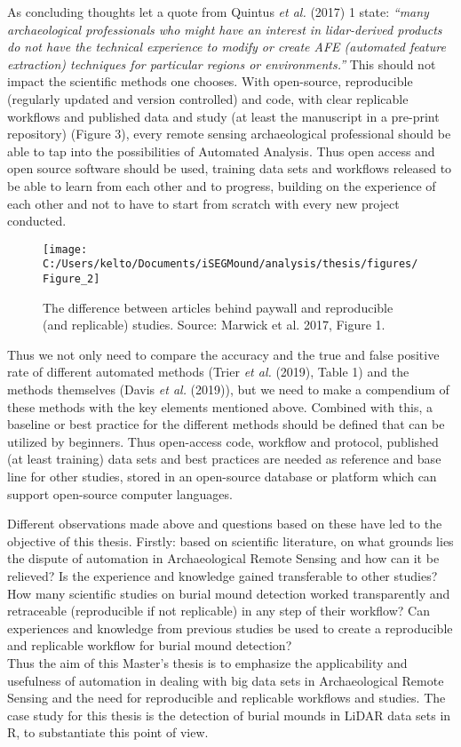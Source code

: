 \documentclass[
  12pt,
]{article}
\begin{document}
As concluding thoughts let a quote from Quintus \emph{et al.} (2017) 1 state: \emph{``many archaeological professionals who might have an interest in lidar-derived products do not have the technical experience to modify or create AFE (automated feature extraction) techniques for particular regions or environments.''} This should not impact the scientific methods one chooses. With open-source, reproducible (regularly updated and version controlled) and code, with clear replicable workflows and published data and study (at least the manuscript in a pre-print repository) (Figure 3), every remote sensing archaeological professional should be able to tap into the possibilities of Automated Analysis. Thus open access and open source software should be used, training data sets and workflows released to be able to learn from each other and to progress, building on the experience of each other and not to have to start from scratch with every new project conducted.

\begin{figure}

{\centering \texttt{[image: C:/Users/kelto/Documents/iSEGMound/analysis/thesis/figures/Figure\_2]} 

}

\caption{The difference between articles behind paywall and reproducible (and replicable) studies. Source: Marwick et al. 2017, Figure 1.}\label{fig:Figure2}
\end{figure}

Thus we not only need to compare the accuracy and the true and false positive rate of different automated methods (Trier \emph{et al.} (2019), Table 1) and the methods themselves (Davis \emph{et al.} (2019)), but we need to make a compendium of these methods with the key elements mentioned above. Combined with this, a baseline or best practice for the different methods should be defined that can be utilized by beginners. Thus open-access code, workflow and protocol, published (at least training) data sets and best practices are needed as reference and base line for other studies, stored in an open-source database or platform which can support open-source computer languages.

Different observations made above and questions based on these have led to the objective of this thesis. Firstly: based on scientific literature, on what grounds lies the dispute of automation in Archaeological Remote Sensing and how can it be relieved? Is the experience and knowledge gained transferable to other studies? How many scientific studies on burial mound detection worked transparently and retraceable (reproducible if not replicable) in any step of their workflow? Can experiences and knowledge from previous studies be used to create a reproducible and replicable workflow for burial mound detection?\\
Thus the aim of this Master's thesis is to emphasize the applicability and usefulness of automation in dealing with big data sets in Archaeological Remote Sensing and the need for reproducible and replicable workflows and studies. The case study for this thesis is the detection of burial mounds in LiDAR data sets in R, to substantiate this point of view.
\end{document}
